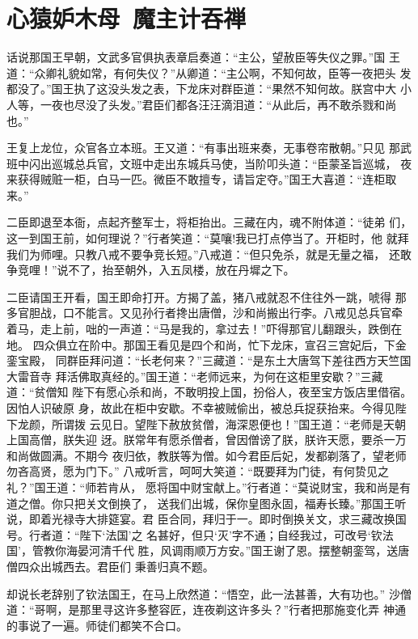 \chapter{心猿妒木母~魔主计吞禅}

话说那国王早朝，文武多官俱执表章启奏道：“主公，望赦臣等失仪之罪。”国
王道：“众卿礼貌如常，有何失仪？”从卿道：“主公啊，不知何故，臣等一夜把头
发都没了。”国王执了这没头发之表，下龙床对群臣道：“果然不知何故。朕宫中大
小人等，一夜也尽没了头发。”君臣们都各汪汪滴泪道：“从此后，再不敢杀戮和尚
也。”

王复上龙位，众官各立本班。王又道：“有事出班来奏，无事卷帘散朝。”只见
那武班中闪出巡城总兵官，文班中走出东城兵马使，当阶叩头道：“臣蒙圣旨巡城，
夜来获得贼赃一柜，白马一匹。微臣不敢擅专，请旨定夺。”国王大喜道：“连柜取
来。”

二臣即退至本衙，点起齐整军士，将柜抬出。三藏在内，魂不附体道：“徒弟
们，这一到国王前，如何理说？”行者笑道：“莫嚷!我已打点停当了。开柜时，他
就拜我们为师哩。只教八戒不要争竞长短。”八戒道：“但只免杀，就是无量之福，
还敢争竞哩！”说不了，抬至朝外，入五凤楼，放在丹墀之下。

二臣请国王开看，国王即命打开。方揭了盖，猪八戒就忍不住往外一跳，唬得
那多官胆战，口不能言。又见孙行者搀出唐僧，沙和尚搬出行李。八戒见总兵官牵
着马，走上前，咄的一声道：“马是我的，拿过去！”吓得那官儿翻跟头，跌倒在地。
四众俱立在阶中。那国王看见是四个和尚，忙下龙床，宣召三宫妃后，下金銮宝殿，
同群臣拜问道：“长老何来？”三藏道：“是东土大唐驾下差往西方天竺国大雷音寺
拜活佛取真经的。”国王道：“老师远来，为何在这柜里安歇？”三藏道：“贫僧知
陛下有愿心杀和尚，不敢明投上国，扮俗人，夜至宝方饭店里借宿。因怕人识破原
身，故此在柜中安歇。不幸被贼偷出，被总兵捉获抬来。今得见陛下龙颜，所谓拨
云见日。望陛下赦放贫僧，海深恩便也！”国王道：“老师是天朝上国高僧，朕失迎
迓。朕常年有愿杀僧者，曾因僧谤了朕，朕许天愿，要杀一万和尚做圆满。不期今
夜归依，教朕等为僧。如今君臣后妃，发都剃落了，望老师勿吝高贤，愿为门下。”
八戒听言，呵呵大笑道：“既要拜为门徒，有何贽见之礼？”国王道：“师若肯从，
愿将国中财宝献上。”行者道：“莫说财宝，我和尚是有道之僧。你只把关文倒换了，
送我们出城，保你皇图永固，福寿长臻。”那国王听说，即着光禄寺大排筵宴。君
臣合同，拜归于一。即时倒换关文，求三藏改换国号。行者道：“陛下‘法国’之
名甚好，但只‘灭’字不通；自经我过，可改号‘钦法国’，管教你海晏河清千代
胜，风调雨顺万方安。”国王谢了恩。摆整朝銮驾，送唐僧四众出城西去。君臣们
秉善归真不题。

却说长老辞别了钦法国王，在马上欣然道：“悟空，此一法甚善，大有功也。”
沙僧道：“哥啊，是那里寻这许多整容匠，连夜剃这许多头？”行者把那施变化弄
神通的事说了一遍。师徒们都笑不合口。


